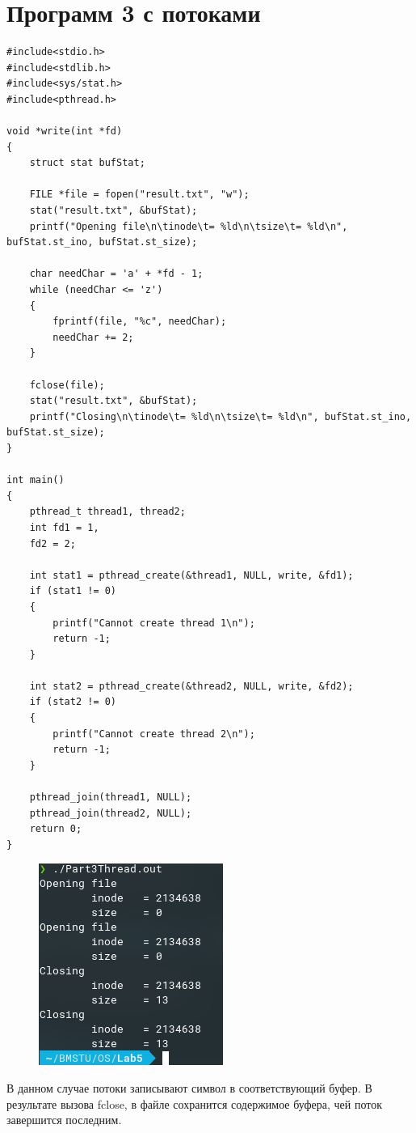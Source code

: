 \documentclass[14pt, a4paper]{extarticle}
\begin{document}
\section*{Программ 3 с потоками}
\begin{lstlisting}
#include<stdio.h>
#include<stdlib.h>
#include<sys/stat.h>
#include<pthread.h>

void *write(int *fd)
{
	struct stat bufStat;
	
	FILE *file = fopen("result.txt", "w");
	stat("result.txt", &bufStat);
	printf("Opening file\n\tinode\t= %ld\n\tsize\t= %ld\n", bufStat.st_ino, bufStat.st_size);
	
	char needChar = 'a' + *fd - 1;    
	while (needChar <= 'z') 
	{
		fprintf(file, "%c", needChar);
		needChar += 2;
	}
	
	fclose(file);
	stat("result.txt", &bufStat);
	printf("Closing\n\tinode\t= %ld\n\tsize\t= %ld\n", bufStat.st_ino, bufStat.st_size);
}

int main()
{
	pthread_t thread1, thread2;
	int fd1 = 1,
	fd2 = 2;
	
	int stat1 = pthread_create(&thread1, NULL, write, &fd1);
	if (stat1 != 0)
	{
		printf("Cannot create thread 1\n");
		return -1;
	}
	
	int stat2 = pthread_create(&thread2, NULL, write, &fd2);
	if (stat2 != 0)
	{
		printf("Cannot create thread 2\n");
		return -1;
	}
	
	pthread_join(thread1, NULL);
	pthread_join(thread2, NULL);
	return 0;
}
\end{lstlisting}
\begin{figure}[h!]
	\includegraphics[scale=1]{source/Part3Thread.png}
\end{figure}
В данном случае потоки записывают символ в соответствующий буфер. В результате вызова fclose, в файле сохранится содержимое буфера, чей поток завершится последним.\\
\end{document}

